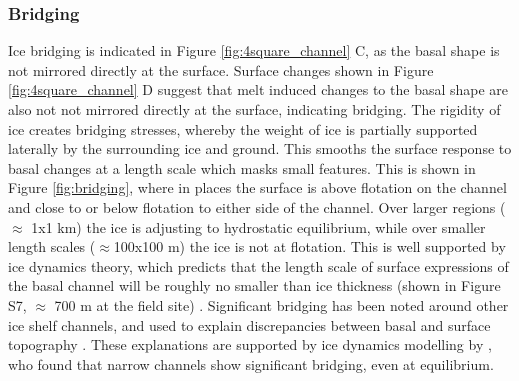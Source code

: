 \subsubsection{Bridging} \label{sec:bridging}

Ice bridging is indicated in Figure \ref{fig:4square_channel} C, as the basal shape is not mirrored directly at the surface. Surface changes shown in Figure \ref{fig:4square_channel} D suggest that melt induced changes to the basal shape are also not not mirrored directly at the surface, indicating bridging. The rigidity of ice creates bridging stresses, whereby the weight of ice is partially supported laterally by the surrounding ice and ground. This smooths the surface response to basal changes at a length scale which masks small features. 
This is shown in Figure \ref{fig:bridging}, where in places the surface is above flotation on the channel and close to or below flotation to either side of the channel. Over larger regions ($\approx$ 1x1 km) the ice is adjusting to hydrostatic equilibrium, while over smaller length scales ($\approx$100x100 m) the ice is not at flotation. 
This is well supported by ice dynamics theory, which predicts that the length scale of surface expressions of the basal channel will be roughly no smaller than ice thickness  (shown in Figure S7, $\approx$ 700 m at the field site) \cite [e.g.][] {gudmundsson2008limit}.
Significant bridging has been noted around other ice shelf channels, and used to explain discrepancies between basal and surface topography \cite [e.g.][] {dutrieux2013pine,chartrand2020basal,vaughan2012subglacial}. These explanations are supported by ice dynamics modelling by \cite{drews2015evolution}, who found that narrow channels show significant bridging, even at equilibrium. 


